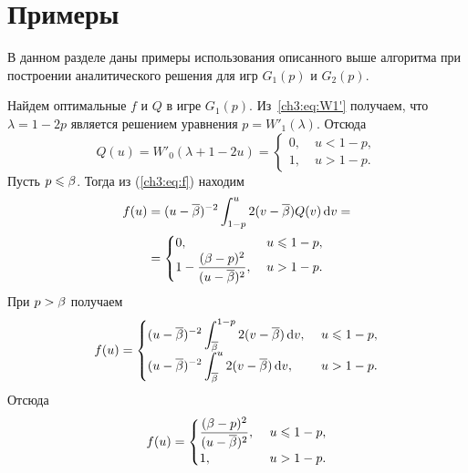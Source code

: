 {\section{Примеры}\label{ch3:sec:examples}

В данном разделе даны примеры использования описанного выше алгоритма при построении аналитического решения для игр $G_1(p)$ и $G_2(p)$.

\begin{example}
  Найдем оптимальные $f$ и $Q$ в игре $G_1(p)$.
  Из~\eqref{ch3:eq:W1'} получаем, что $\lambda = 1 - 2p$ является решением уравнения $p = W'_1(\lambda)$.
  Отсюда
  \begin{equation*}
    Q(u) = W'_0(\lambda + 1 - 2u) = \begin{cases}
      0, &\; u < 1 - p,\\
      1, &\; u > 1 - p.
    \end{cases}
  \end{equation*}
  Пусть $p \leqslant \beta$.
  Тогда из (\ref{ch3:eq:f}) находим
  \begin{align*}
    f(u) 
    &=
      (u - {{\overline{\beta}}})^{-2} \int_{1-p}^u 2 (v - {{\overline{\beta}}}) Q(v) \mathop{}\!\mathrm{d} v = \\
    &=
      \begin{cases}
        0, &\; u \leqslant 1 - p,\\
        1 - {\displaystyle \frac{(\beta - p)^2}{(u-{{\overline{\beta}}})^2}}, &\; u > 1 - p.
      \end{cases}
  \end{align*}
  При $p > \beta$ получаем
  \begin{equation*}
    f(u)= \begin{cases}
      {\displaystyle (u-\DCo)^{-2} \int_\DCo^{1-p} 2 (v - \DCo) \di v},\ & u \leq 1 - p,\\
      {\displaystyle (u - \DCo)^{-2} \int_\DCo^u 2 (v - \DCo) \di v},\ & u > 1 - p.
    \end{cases}                                                     
  \end{equation*}
  Отсюда
  \begin{equation*}
    f(u) = \begin{cases}
      {\displaystyle \frac{(\ensuremath{\beta}- p)^2}{(u - \ensuremath{{{\overline{\beta}}}})^2}},\ & u \leqslant 1 - p,\\
      1,\ & u > 1 - p.
    \end{cases}  
  \end{equation*}
\end{example}

}
